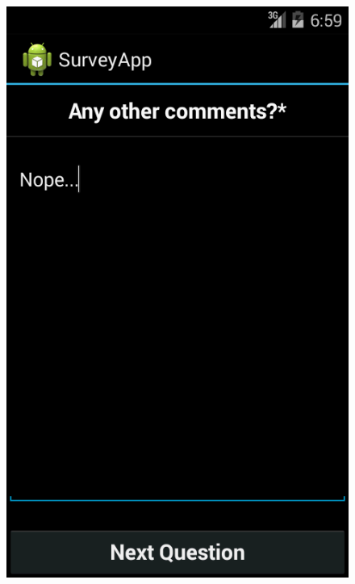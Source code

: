 \documentclass[runningheads,a4paper]{llncs}
\begin{document}
\begin{figure}[htb]
{	\includegraphics[scale=0.22]{images/android/android_6}}
	\quad
	\subfigure[Outro]{
}
\end{figure}
\end{document}
